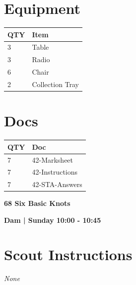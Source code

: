 \documentclass[10pt]{article}
\newcommand{\newtitle}[1]{\begin{center}{\Huge\bfseries #1 }\\ \vspace{5mm}\end{center}}
\newcommand{\newsubtitle}[1]{\begin{center}{\color{grey}\Large\bfseries #1 }\\ \vspace{5mm}\end{center}}
\begin{document}
	\begin{multicols}{2}

		\section*{\faWrench \: Equipment}

		
	\begin{center}
			\begin{tabular}{p{2cm}p{4cm}}


				\textbf{QTY} & \textbf{Item} \\\toprule
												3&Table\\\midrule
												3&Radio\\\midrule
												6&Chair\\\midrule
												2&Collection Tray\\\midrule
								\end{tabular}

			\end{center}

		
		\vfill\null
		\columnbreak

			\section*{\faFile \: Docs}
		 	\begin{center}
			\begin{tabular}{p{2cm}p{4cm}}

			\textbf{QTY} & \textbf{Doc} \\\toprule
										7&42-Marksheet\\\midrule
										7&42-Instructions\\\midrule
										7&42-STA-Answers\\\midrule
							\end{tabular}
			\end{center}
	

		\vfill\null

		\end{multicols}



	\vspace{1cm}


	\clearpage
		\newtitle{68 Six Basic Knots }
	\newsubtitle{Dam | Sunday 10:00 - 10:45}
		\setcounter{section}{67}
	\section*{Scout Instructions}
		\textit{None}
	
\end{document}
